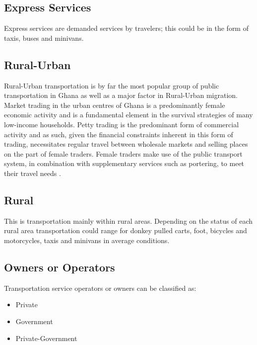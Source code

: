 \subsection{Express Services}
Express services are demanded services by travelers; this could be in the form of taxis, buses and minivans.

\subsection{Rural-Urban}
Rural-Urban transportation is by far the most popular group of public transportation in Ghana as well as a major factor in Rural-Urban migration. Market trading in the urban centres of Ghana is a predominantly female economic activity and is a fundamental element in the survival strategies of many low-income households. Petty trading is the predominant form of commercial activity and as such, given the financial constraints inherent in this form of trading, necessitates regular travel between wholesale markets and selling places on the part of female traders. Female traders make use of the public transport system, in combination with supplementary services such as portering, to meet their travel needs \citep{grieco1995informal}. 

\subsection{Rural}
This is transportation mainly within rural areas. Depending on the status of each rural area transportation could range for donkey pulled carts, foot, bicycles and motorcycles, taxis and minivans in average conditions.

\subsection{Owners or Operators}
Transportation service operators or owners can be classified as:
\begin{itemize}
	\item Private
	\item Government
	\item Private-Government
\end{itemize}

